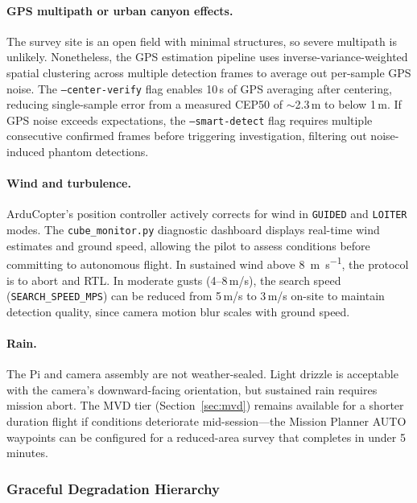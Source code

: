 \paragraph{GPS multipath or urban canyon effects.}
The survey site is an open field with minimal structures, so severe multipath is unlikely.  Nonetheless, the GPS estimation pipeline uses inverse-variance-weighted spatial clustering across multiple detection frames to average out per-sample GPS noise.  The \texttt{--center-verify} flag enables 10\,s of GPS averaging after centering, reducing single-sample error from a measured CEP50 of ${\sim}$2.3\,m to below 1\,m.  If GPS noise exceeds expectations, the \texttt{--smart-detect} flag requires multiple consecutive confirmed frames before triggering investigation, filtering out noise-induced phantom detections.

\paragraph{Wind and turbulence.}
ArduCopter's position controller actively corrects for wind in \texttt{GUIDED} and \texttt{LOITER} modes.  The \texttt{cube\_monitor.py} diagnostic dashboard displays real-time wind estimates and ground speed, allowing the pilot to assess conditions before committing to autonomous flight.  In sustained wind above \SI{8}{\metre\per\second}, the protocol is to abort and RTL.  In moderate gusts (4--8\,m/s), the search speed (\texttt{SEARCH\_SPEED\_MPS}) can be reduced from 5\,m/s to 3\,m/s on-site to maintain detection quality, since camera motion blur scales with ground speed.

\paragraph{Rain.}
The Pi and camera assembly are not weather-sealed.  Light drizzle is acceptable with the camera's downward-facing orientation, but sustained rain requires mission abort.  The MVD tier (Section~\ref{sec:mvd}) remains available for a shorter duration flight if conditions deteriorate mid-session---the Mission Planner AUTO waypoints can be configured for a reduced-area survey that completes in under 5 minutes.

\subsubsection{Graceful Degradation Hierarchy}\label{sec:graceful-deg}

